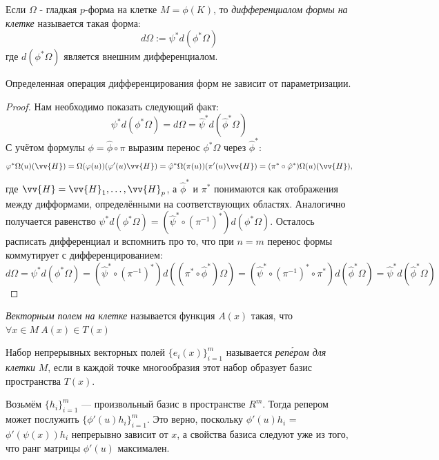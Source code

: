 \begin{definition}
	Если $\Omega$ - гладкая $p$-форма на клетке $M = \phi(K)$, то \textit{дифференциалом формы на клетке} называется такая форма:
	\[
		d\Omega := \psi^*d(\phi^*\Omega)
	\]
	где $d(\phi^*\Omega)$ является внешним дифференциалом.
\end{definition}

\begin{lemma}
	Определенная операция дифференцирования форм не зависит от параметризации.
\end{lemma}

\begin{proof}
	Нам необходимо показать следующий факт:
	\[
		\psi^*d(\phi^*\Omega) = d\Omega = \hat{\psi}^*d(\hat{\phi}^*\Omega)
	\]
	С учётом формулы $\phi = \hat\phi\circ\pi$ выразим перенос $\phi^*\Omega$ через $\hat{\phi}^*$:
	\[
		\phi^*\Omega(u)(\vv{H}) = \Omega(\phi(u))(\phi'(u)\vv{H}) = \hat{\phi}^*\Omega(\pi(u))(\pi'(u)\vv{H}) = (\pi^* \circ \hat{\phi}^*)\Omega(u)(\vv{H}),
	\]
	где $\vv{H} = \vv{H}_1, \ldots, \vv{H}_p$, а $\hat\phi^*$ и $\pi^*$ понимаются как отображения между дифформами, определёнными на соответствующих областях.
	Аналогично получается равенство $\psi^*d(\phi^*\Omega) = (\hat{\psi}^* \circ (\pi^{-1})^*)d(\phi^*\Omega)$.
	Осталось расписать дифференциал и вспомнить про то, что при $n = m$ перенос формы коммутирует с дифференцированием:
	\[
		d\Omega = \psi^*d(\phi^*\Omega) = (\hat{\psi}^* \circ (\pi^{-1})^*)d((\pi^* \circ \hat{\phi}^*)\Omega) = (\hat{\psi}^* \circ (\pi^{-1})^* \circ \pi^*)d(\hat{\phi}^*\Omega) = \hat{\psi}^*d(\hat{\phi}^*\Omega)
	\]
\end{proof}

\begin{definition}
	\textit{Векторным полем на клетке} называется функция $A(x)$ такая, что $\forall x \in M\ A(x) \in T(x)$
\end{definition}

\begin{definition}
	Набор непрерывных векторных полей $\{e_i(x)\}_{i = 1}^m$ называется \textit{реп\'{е}ром для клетки} $M$, если в каждой точке многообразия этот набор образует базис пространства $T(x)$.
\end{definition}

\begin{example}
	Возьмём $\{h_i\}_{i=1}^m$ --- произвольный базис в пространстве $R^m$. Тогда репером может послужить $\{\phi'(u)h_i\}_{i=1}^m$. Это верно, поскольку $\phi'(u)h_i$ = $\phi'(\psi(x))h_i$ непрерывно зависит от $x$, а свойства базиса следуют уже из того, что ранг матрицы $\phi'(u)$ максимален.
\end{example}

